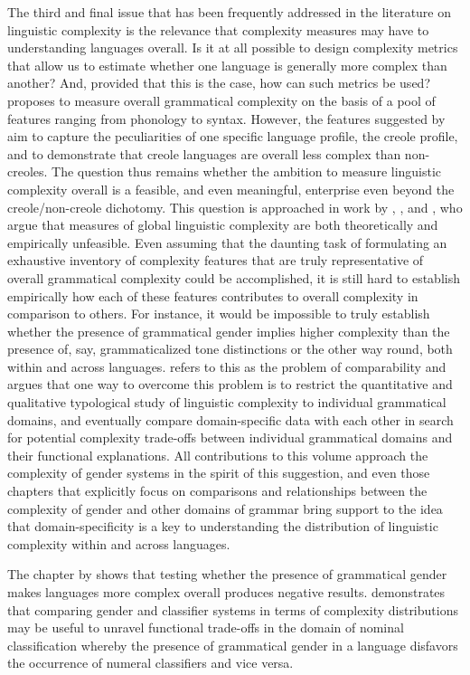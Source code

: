 \documentclass[output=collectionpaper]{langsci/langscibook}
\begin{document}
The third and final issue that has been frequently addressed in the literature on linguistic complexity is the relevance that complexity measures may have to understanding languages overall. Is it at all possible to design complexity metrics that allow us to estimate whether one language is generally more complex than another? And, provided that this is the case, how can such metrics be used? \citet{McWhorter2001} proposes to measure overall grammatical complexity on the basis of a pool of features ranging from phonology to syntax. However, the features suggested by \citet{McWhorter2001} aim to capture the peculiarities of one specific language profile, the creole profile, and to demonstrate that creole languages are overall less complex than non-creoles. The question thus remains whether the ambition to measure linguistic complexity overall is a feasible, and even meaningful, enterprise even beyond the creole/non-creole dichotomy. This question is approached in work by \citet{Miestamo2008}, \citet{Nichols2009}, and \citet{Sinnemaeki2014}, who argue that measures of global linguistic complexity are both theoretically and empirically unfeasible. Even assuming that the daunting task of formulating an exhaustive inventory of complexity features that are truly representative of overall grammatical complexity could be accomplished, it is still hard to establish empirically how each of these features contributes to overall complexity in comparison to others. For instance, it would be impossible to truly establish whether the presence of grammatical gender implies higher complexity than the presence of, say, grammaticalized tone distinctions or the other way round, both within and across languages. \citet{Miestamo2008} refers to this as the problem of comparability and argues that one way to overcome this problem is to restrict the quantitative and qualitative typological study of linguistic complexity to individual grammatical domains, and eventually compare domain-specific data with each other in search for potential complexity trade-offs between individual grammatical domains and their functional explanations. All contributions to this volume approach the complexity of gender systems in the spirit of this suggestion, and even those chapters that explicitly focus on comparisons and relationships between the complexity of gender and other domains of grammar bring support to the idea that domain-specificity is a key to understanding the distribution of linguistic complexity within and across languages.

The chapter by  shows that testing whether the presence of grammatical gender makes languages more complex overall produces negative results.  demonstrates that comparing gender and classifier systems in terms of complexity distributions may be useful to unravel functional trade-offs in the domain of nominal classification whereby the presence of grammatical gender in a language disfavors the occurrence of numeral classifiers and vice versa.
\end{document}
